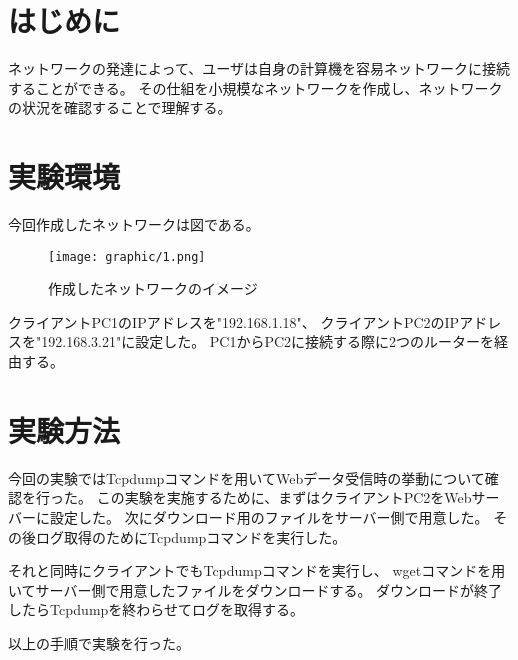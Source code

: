 \documentclass[twocolumn]{jsarticle}
\begin{document}

\section{はじめに}
ネットワークの発達によって、ユーザは自身の計算機を容易ネットワークに接続することができる。
その仕組を小規模なネットワークを作成し、ネットワークの状況を確認することで理解する。

\section{実験環境}
今回作成したネットワークは図である。

\begin{figure}[H]
  \begin{center}
    \texttt{[image: graphic/1.png]}
  \end{center}
  \caption{作成したネットワークのイメージ}
  \label{fig:1}
\end{figure}

クライアントPC1のIPアドレスを"192.168.1.18"、
クライアントPC2のIPアドレスを"192.168.3.21"に設定した。
PC1からPC2に接続する際に2つのルーターを経由する。

\section{実験方法}
今回の実験ではTcpdumpコマンドを用いてWebデータ受信時の挙動について確認を行った。
この実験を実施するために、まずはクライアントPC2をWebサーバーに設定した。
次にダウンロード用のファイルをサーバー側で用意した。
その後ログ取得のためにTcpdumpコマンドを実行した。

それと同時にクライアントでもTcpdumpコマンドを実行し、
wgetコマンドを用いてサーバー側で用意したファイルをダウンロードする。
ダウンロードが終了したらTcpdumpを終わらせてログを取得する。

以上の手順で実験を行った。
\end{document}
